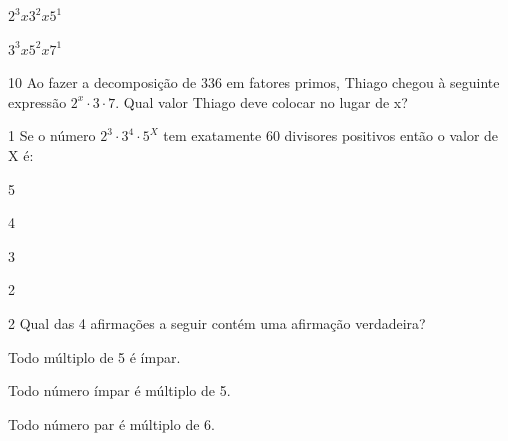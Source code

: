 {\begin{escolha}
\item $2^3 x 3^2 x 5^1$  
\item $3^3 x 5^2 x 7^1$
\end{escolha}


\num{10} Ao fazer a decomposição de 336 em fatores primos, Thiago chegou
à seguinte expressão $2^x \cdot 3 \cdot 7$. Qual valor Thiago deve 
colocar no lugar de x?



\num{1} Se o número $2^3 \cdot 3^4 \cdot 5^X$ tem exatamente 60 divisores positivos então o valor de X é:

\begin{escolha}
  
  \item 5
  
  \item 4
  
  \item 3
  
  \item 2

\end{escolha}


\num{2} Qual das 4 afirmações a seguir contém uma afirmação verdadeira? 

\begin{escolha}
  
  \item Todo múltiplo de 5 é ímpar.
  
  \item Todo número ímpar é múltiplo de 5.
  
  \item Todo número par é múltiplo de 6.
  

\end{escolha}}
